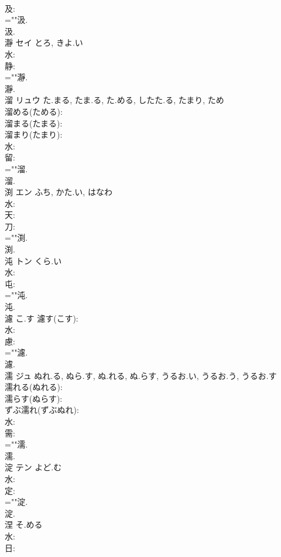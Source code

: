 \documentclass[8pt]{extreport}
\begin{document}
\begin{CJK}{UTF8}{min}
\\	及: 
\\	=""汲.
\\	汲.
\\	瀞	セイ	とろ, きよ.い		
\\	水: 
\\	静: 
\\	=""瀞.
\\	瀞.
\\	溜	リュウ	た.まる, たま.る, た.める, したた.る, たまり, ため		
\\	溜める(ためる): 
\\	溜まる(たまる): 
\\	溜まり(たまり): 
\\	水: 
\\	留: 
\\	=""溜.
\\	溜.
\\	渕	エン	ふち, かた.い, はなわ		
\\	水: 
\\	天: 
\\	刀: 
\\	=""渕.
\\	渕.
\\	沌	トン	くら.い		
\\	水: 
\\	屯: 
\\	=""沌.
\\	沌.
\\	濾		こ.す			濾す(こす): 
\\	水: 
\\	慮: 
\\	=""濾.
\\	濾.
\\	濡	ジュ	ぬれ.る, ぬら.す, ぬ.れる, ぬ.らす, うるお.い, うるお.う, うるお.す		
\\	濡れる(ぬれる): 
\\	濡らす(ぬらす): 
\\	ずぶ濡れ(ずぶぬれ): 
\\	水: 
\\	需: 
\\	=""濡.
\\	濡.
\\	淀	テン	よど.む		
\\	水: 
\\	定: 
\\	=""淀.
\\	淀.
\\	涅		そ.める				
\\	水: 
\\	日: 

\end{CJK}
\end{document}
